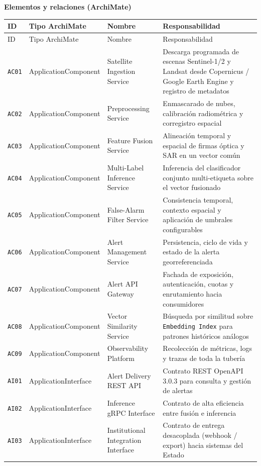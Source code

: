 \documentclass{article}
\newcommand{\mdhfour}[1]{\par\medskip\noindent\textbf{#1}\par\nobreak\smallskip}
\begin{document}
\mdhfour{Elementos y relaciones (ArchiMate)}

{\small
\begin{longtable}{@{}L{0.40in}L{1.50in}L{1.15in}L{2.89in}@{}}
\toprule
ID & Tipo ArchiMate & Nombre & Responsabilidad \\
\midrule
\endfirsthead
\toprule
ID & Tipo ArchiMate & Nombre & Responsabilidad \\
\midrule
\endhead
\bottomrule
\endlastfoot
\texttt{AC01} & ApplicationComponent & Satellite Ingestion Service & Descarga programada de escenas Sentinel-1/2 y Landsat desde Copernicus / Google Earth Engine y registro de metadatos \\
\texttt{AC02} & ApplicationComponent & Preprocessing Service & Enmascarado de nubes, calibración radiométrica y corregistro espacial \\
\texttt{AC03} & ApplicationComponent & Feature Fusion Service & Alineación temporal y espacial de firmas óptica y SAR en un vector común \\
\texttt{AC04} & ApplicationComponent & Multi-Label Inference Service & Inferencia del clasificador conjunto multi-etiqueta sobre el vector fusionado \\
\texttt{AC05} & ApplicationComponent & False-Alarm Filter Service & Consistencia temporal, contexto espacial y aplicación de umbrales configurables \\
\texttt{AC06} & ApplicationComponent & Alert Management Service & Persistencia, ciclo de vida y estado de la alerta georreferenciada \\
\texttt{AC07} & ApplicationComponent & Alert API Gateway & Fachada de exposición, autenticación, cuotas y enrutamiento hacia consumidores \\
\texttt{AC08} & ApplicationComponent & Vector Similarity Service & Búsqueda por similitud sobre \texttt{Embedding Index} para patrones históricos análogos \\
\texttt{AC09} & ApplicationComponent & Observability Platform & Recolección de métricas, logs y trazas de toda la tubería \\
\texttt{AI01} & ApplicationInterface & Alert Delivery REST API & Contrato REST OpenAPI 3.0.3 para consulta y gestión de alertas \\
\texttt{AI02} & ApplicationInterface & Inference gRPC Interface & Contrato de alta eficiencia entre fusión e inferencia \\
\texttt{AI03} & ApplicationInterface & Institutional Integration Interface & Contrato de entrega desacoplada (webhook / export) hacia sistemas del Estado \\
\end{longtable}
}
\end{document}
